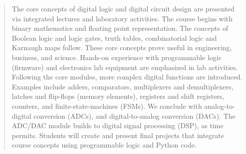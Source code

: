 \documentclass[10pt]{article}
\begin{document}
\maketitle

\begin{abstract}
The core concepts of digital logic and digital circuit design are presented via integrated lectures and laboratory activities.  The course begins with binary mathematics and floating point representation.  The concepts of Boolean logic and logic gates, truth tables, combinatorial logic and Karnaugh maps follow.  These core concepts prove useful in engineering, business, and science.  Hands-on experience with programmable logic (firmware) and electronics lab equipment are emphasized in lab activities.  Following the core modules, more complex digital functions are introduced.  Examples include adders, comparators, multiplexers and demultiplexers, latches and flip-flops (memory elements), registers and shift registers, counters, and finite-state-machines (FSMs).  We conclude with analog-to-digital conversion (ADCs), and digital-to-analog conversion (DACs).  The ADC/DAC module builds to digital signal processing (DSP), as time permits.  Students will create and present final projects that integrate course concepts using programmable logic and Python code.
\end{abstract}
\end{document}
